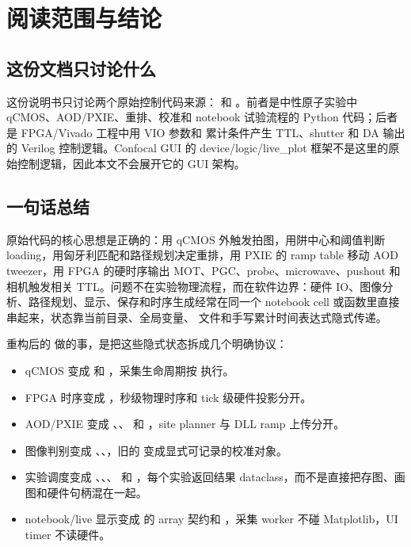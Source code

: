 \documentclass[11pt,oneside,openany]{book}
\begin{document}
\frontmatter
{}
\tableofcontents
\cleardoublepage
\mainmatter


\chapter{阅读范围与结论}
\section{这份文档只讨论什么}
这份说明书只讨论两个原始控制代码来源： 和 。前者是中性原子实验中 qCMOS、AOD/PXIE、重排、校准和 notebook 试验流程的 Python 代码；后者是 FPGA/Vivado 工程中用 VIO 参数和  累计条件产生 TTL、shutter 和 DA 输出的 Verilog 控制逻辑。Confocal GUI 的 device/logic/live\_plot 框架不是这里的原始控制逻辑，因此本文不会展开它的 GUI 架构。

\section{一句话总结}
原始代码的核心思想是正确的：用 qCMOS 外触发拍图，用阱中心和阈值判断 loading，用匈牙利匹配和路径规划决定重排，用 PXIE 的 ramp table 移动 AOD tweezer，用 FPGA 的硬时序输出 MOT、PGC、probe、microwave、pushout 和相机触发相关 TTL。问题不在实验物理流程，而在软件边界：硬件 IO、图像分析、路径规划、显示、保存和时序生成经常在同一个 notebook cell 或函数里直接串起来，状态靠当前目录、全局变量、 文件和手写累计时间表达式隐式传递。

重构后的  做的事，是把这些隐式状态拆成几个明确协议：
\begin{itemize}
  \item qCMOS 变成  和 ，采集生命周期按  执行。
  \item FPGA 时序变成 ，秒级物理时序和 tick 级硬件投影分开。
  \item AOD/PXIE 变成 、、 和 ，site planner 与 DLL ramp 上传分开。
  \item 图像判别变成 、、，旧的  变成显式可记录的校准对象。
  \item 实验调度变成 、、、 和 ，每个实验返回结果 dataclass，而不是直接把存图、画图和硬件句柄混在一起。
  \item notebook/live 显示变成  的 array 契约和 ，采集 worker 不碰 Matplotlib，UI timer 不读硬件。
\end{itemize}
\end{document}
